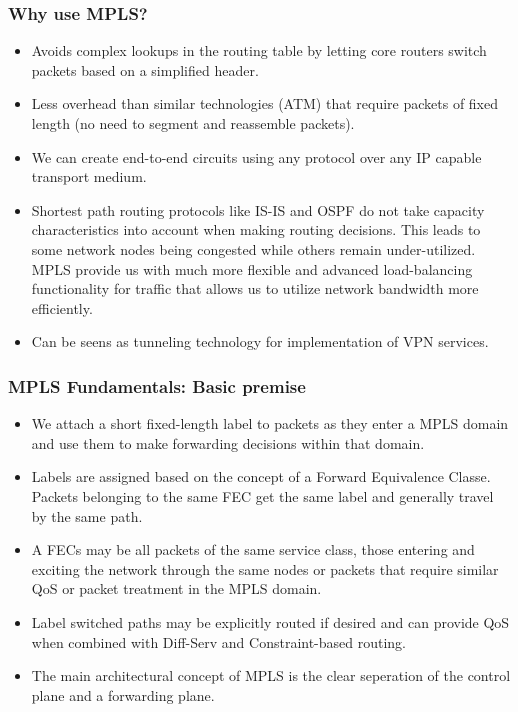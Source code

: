 \documentclass[12pt]{beamer}
\begin{document}
\begin{frame}
  \frametitle{Why use MPLS?}
  \begin{itemize}
    \item Avoids complex lookups in the routing table by letting core routers switch packets based on a simplified header.
    \item Less overhead than similar technologies (ATM) that require packets of fixed length (no need to segment and reassemble packets).
    \item We can create end-to-end circuits using any protocol over any IP capable transport medium.
    \item Shortest path routing protocols like IS-IS and OSPF do not take capacity characteristics into account when making routing decisions. This leads to some network nodes being congested while others remain under-utilized. MPLS provide us with much more flexible and advanced load-balancing functionality for traffic that allows us to utilize network bandwidth more efficiently.
    \item Can be seens as tunneling technology for implementation of VPN services.
  \end{itemize}
\end{frame}

\begin{frame}
  \frametitle{MPLS Fundamentals: Basic premise}
  \begin{itemize}
    \item We attach a short fixed-length label to packets as they enter a MPLS domain and use them to make forwarding decisions within that domain.
    \item Labels are assigned based on the concept of a Forward Equivalence Classe. Packets belonging to the same FEC get the same label and generally travel by the same path.
    \item A FECs may be all packets of the same service class, those entering and exciting the network through the same nodes or packets that require similar QoS or packet treatment in the MPLS domain. 
    \item Label switched paths may be explicitly routed if desired and can provide QoS when combined with Diff-Serv and Constraint-based routing.
    \item The main architectural concept of MPLS is the clear seperation of the control plane and a forwarding plane.   
    \end{itemize}
\end{frame}
\end{document}
